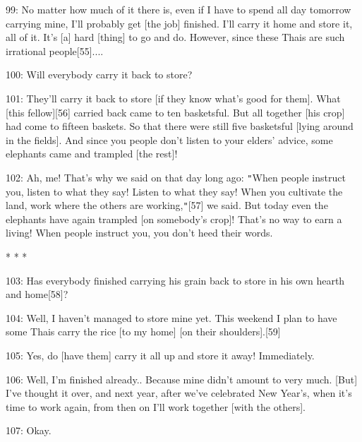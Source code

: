 99: No matter how much of it there is, even if I have to spend all day tomorrow
carrying mine, I'll probably get [the job] finished. I'll carry it home and store
it, all of it. It's [a] hard [thing] to go and do. However, since these Thais are
such irrational people[55]....

100: Will everybody carry it back to store?

101: They'll carry it back to store [if they know what's good for them]. What [this
fellow][56]\textbf{ }carried back came to ten basketsful. But all together [his
crop] had come to fifteen baskets. So that there were still five basketsful [lying
around in the fields]. And since you people don't listen to your elders' advice,
some elephants came and trampled [the rest]!

102: Ah, me! That's why we said on that day long ago: \texttt{"}When people instruct
you, listen to what they say! Listen to what they say! When you cultivate the land,
work where the others are working,\texttt{"}[57] we said. But today even the elephants
have again trampled [on somebody's crop]! That's no way to earn a living! When
people instruct you, you don't heed their words.

\begin{center}
* * *
\end{center}

\leftskip=0pt
103: Has everybody finished carrying his grain back to store in his own hearth
and home[58]?

104: Well, I haven't managed to store mine yet. This weekend I plan to have some
Thais carry the rice [to my home] [on their shoulders].[59]

105: Yes, do [have them] carry it all up and store it away! Immediately.

106: Well, I'm finished already.. Because mine didn't amount to very much. [But]
I've thought it over, and next year, after we've celebrated New Year's, when it's
time to work again, from then on I'll work together [with the others].

107: Okay.

